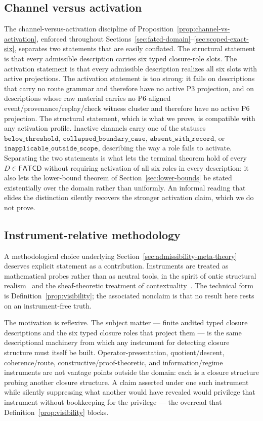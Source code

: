 \documentclass[11pt]{article}
\theoremstyle{definition}
\newcommand{\FATCD}{\ensuremath{\mathsf{FATCD}}}
\newcommand{\belowthr}{\texttt{below\_threshold}}
\newcommand{\collapsedbc}{\texttt{collapsed\_boundary\_case}}
\newcommand{\absentrec}{\texttt{absent\_with\_record}}
\newcommand{\outsidescope}{\texttt{inapplicable\_outside\_scope}}
\newcommand{\Pthree}{\ensuremath{\mathrm{P3}}}
\newcommand{\Psix}{\ensuremath{\mathrm{P6}}}
\begin{document}
\subsection{Channel versus activation}\label{subsec:discussion-channel-vs-activation}

The channel-versus-activation discipline of
Proposition~\ref{prop:channel-vs-activation}, enforced throughout
Sections~\ref{sec:fatcd-domain}--\ref{sec:scoped-exact-six},
separates two statements that are easily conflated. The structural
statement is that every admissible description carries six typed
closure-role slots. The activation statement is that every admissible
description realizes all six slots with active projections. The
activation statement is too strong: it fails on descriptions that
carry no route grammar and therefore have no active \Pthree{}
projection, and on descriptions whose raw material carries no
\Psix{}-aligned event/provenance/replay/check witness cluster and
therefore have no active \Psix{} projection. The structural
statement, which is what we prove, is compatible with any activation
profile. Inactive channels carry one of the statuses
\(\belowthr{}\), \(\collapsedbc{}\), \(\absentrec{}\), or
\(\outsidescope{}\), describing the way a role fails to activate.
Separating the two statements is what lets the terminal theorem hold
of every \(D \in \FATCD{}\) without requiring activation of all six
roles in every description; it also lets the lower-bound theorem of
Section~\ref{sec:lower-bounds} be stated existentially over the
domain rather than uniformly. An informal reading that elides the
distinction silently recovers the stronger activation claim, which we
do not prove.

\subsection{Instrument-relative methodology}\label{subsec:discussion-instrument-relative}

A methodological choice underlying
Section~\ref{sec:admissibility-meta-theory} deserves explicit
statement as a contribution. Instruments are treated as mathematical
probes rather than as neutral tools, in the spirit of ontic structural
realism~\citep{LadymanRoss2007} and the sheaf-theoretic treatment of
contextuality~\citep{AbramskyBrandenburger2011}. The technical form
is Definition~\ref{prop:visibility}; the associated nonclaim is that
no result here rests on an instrument-free truth.

The motivation is reflexive. The subject matter --- finite audited
typed closure descriptions and the six typed closure roles that
project them --- is the same descriptional machinery from which any
instrument for detecting closure structure must itself be built.
Operator-presentation, quotient/descent, coherence/route,
constructive/proof-theoretic, and information/regime instruments are
not vantage points outside the domain: each is a closure structure
probing another closure structure. A claim asserted under one such
instrument while silently suppressing what another would have
revealed would privilege that instrument without bookkeeping for the
privilege --- the overread that Definition~\ref{prop:visibility}
blocks.
\end{document}
